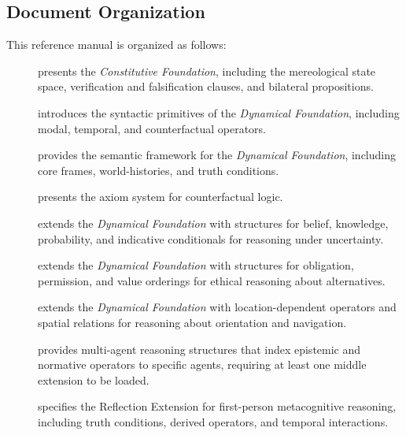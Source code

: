 \documentclass[../LogosReference.tex]{subfiles}
\begin{document}

\subsection{Document Organization}\label{sec:document-organization}

This reference manual is organized as follows:


\begin{description}
	\item[] presents the \textit{Constitutive Foundation}, including the mereological state space, verification and falsification clauses, and bilateral propositions.

	\item[] introduces the syntactic primitives of the \textit{Dynamical Foundation}, including modal, temporal, and counterfactual operators.

	\item[] provides the semantic framework for the \textit{Dynamical Foundation}, including core frames, world-histories, and truth conditions.

	\item[] presents the axiom system for counterfactual logic.

	\item[] extends the \textit{Dynamical Foundation} with structures for belief, knowledge, probability, and indicative conditionals for reasoning under uncertainty.

	\item[] extends the \textit{Dynamical Foundation} with structures for obligation, permission, and value orderings for ethical reasoning about alternatives.

	\item[] extends the \textit{Dynamical Foundation} with location-dependent operators and spatial relations for reasoning about orientation and navigation.

	\item[] provides multi-agent reasoning structures that index epistemic and normative operators to specific agents, requiring at least one middle extension to be loaded.

	\item[] specifies the Reflection Extension for first-person metacognitive reasoning, including truth conditions, derived operators, and temporal interactions.
\end{description}
\end{document}
